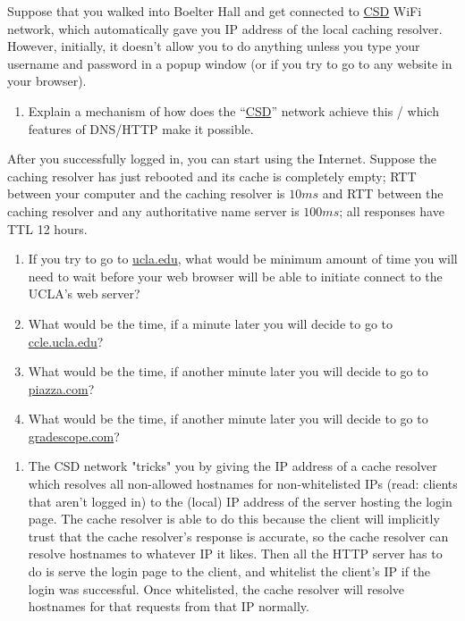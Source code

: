 \documentclass{report}
\begin{document}
\clearpage
\begin{problem}

Suppose that you walked into Boelter Hall and get connected to \url{CSD} WiFi
network, which automatically gave you IP address of the local caching resolver.
However, initially, it doesn't allow you to do anything unless you type your
username and password in a popup window (or if you try to go to any website in
your browser).

\begin{enumerate}

\item Explain a mechanism of how does the ``\url{CSD}'' network achieve this /
      which features of DNS/HTTP make it possible.

\end{enumerate}

After you successfully logged in, you can start using the Internet. Suppose
the caching resolver has just rebooted and its cache is completely empty; RTT
between your computer and the caching resolver is $10 ms$ and RTT between the
caching resolver and any authoritative name server is $100 ms$; all responses
have TTL 12 hours.

\begin{enumerate}\addtocounter{enumi}{1}
\item If you try to go to \url{ucla.edu}, what would be minimum amount of time
  you will need to wait before your web browser will be able to initiate
  connect to the UCLA's web server?

\item What would be the time, if a minute later you will decide to go to
      \url{ccle.ucla.edu}?

\item What would be the time, if another minute later you will decide to go to
      \url{piazza.com}?

\item What would be the time, if another minute later you will decide to go to
      \url{gradescope.com}?

\end{enumerate}

\begin{answer}{30em}
  \begin{enumerate}
  \item The CSD network "tricks" you by giving the IP address of a cache
        resolver which resolves all non-allowed hostnames for non-whitelisted IPs
        (read: clients that aren't logged in) to the (local) IP address of the
        server hosting the login page. The cache resolver is able to do this
        because the client will implicitly trust that the cache resolver's
        response is accurate, so the cache resolver can resolve hostnames to
        whatever IP it likes. Then all the HTTP server has to do is serve the
        login page to the client, and whitelist the client's IP if the login
        was successful. Once whitelisted, the cache resolver will resolve
        hostnames for that requests from that IP normally.


\end{enumerate}
\end{answer}
\end{problem}
\end{document}
